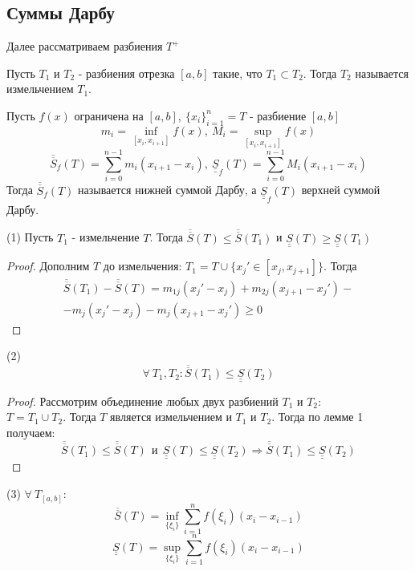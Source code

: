 \subsection{Суммы Дарбу}
Далее рассматриваем разбиения $T^+$
\begin{definition}
    Пусть $T_{1}$ и $T_{2}$ - разбиения отрезка $[a,b]$ такие, что $T_1\subset T_2$. Тогда $T_2$ называется измельчением $T_1$.
\end{definition} 
\begin{definition}
    Пусть $f(x)$ ограничена на $[a,b],\ \{x_i\}_{i=1}^n=T$ - разбиение $[a,b]$
    \[m_i=\inf\limits_{[x_i, x_{i+1}]} f(x),\ M_i=\sup\limits_{[x_i, x_{i+1}]}f(x)\] 
    \[\overline{\overline{S}}_f(T)=\sum\limits_{i=0}^{n-1}m_i(x_{i+1}-x_i),\ \underline{\underline{S}}_f(T)=\sum\limits_{i=0}^{n-1}M_i(x_{i+1}-x_i)\]
    Тогда $\overline{\overline{S}}_f(T)$ называется нижней суммой Дарбу, а $\underline{\underline{S}}_f(T)$ верхней суммой Дарбу.
\end{definition} 
\begin{lemma} (1)
    Пусть $T_1$ - измельчение $T$. Тогда $\overline{\overline{S}}(T)\leq \overline{\overline{S}}(T_1)$ и $\underline{\underline{S}}(T)\geq \underline{\underline{S}}(T_1)$
\end{lemma} 
\begin{proof}
    Дополним $T$ до измельчения: $T_1=T\cup \{x_j'\in [x_j, x_{j+1}]\}$. Тогда 
    \begin{multline*}
        \overline{\overline{S}}(T_1)-\overline{\overline{S}}(T)=m_{1j}(x_j'-x_j)+m_{2j}(x_{j+1}-x_j')-\\
        -m_j(x_j'-x_j)-m_j(x_{j+1}-x_j')\geq 0
    \end{multline*}
\end{proof} 
\begin{lemma} (2) 
    \[\forall\ T_1, T_2: \overline{\overline{S}}(T_1)\leq \underline{\underline{S}}(T_2)\]
\end{lemma} 
\begin{proof}
    Рассмотрим объединение любых двух разбиений $T_1$ и $T_2$:\\ $T=T_1\cup T_2$. Тогда $T$ является измельчением и $T_1$ и $T_2$. Тогда по лемме 1 получаем:
    \[\overline{\overline{S}}(T_1)\leq \overline{\overline{S}}(T)\ \ \text{и}\ \ \underline{\underline{S}}(T)\leq \underline{\underline{S}}(T_2) \Rightarrow \overline{\overline{S}}(T_1)\leq \underline{\underline{S}}(T_2)\]
\end{proof} 
\begin{lemma} (3) $\forall\ T_{[a,b]}:$
    \[\overline{\overline{S}}(T)=\inf\limits_{\{\xi_i\}}\sum\limits_{i=1}^{n}f(\xi_i)(x_i-x_{i-1})\]
    \[\underline{\underline{S}}(T)=\sup\limits_{\{\xi_i\}}\sum\limits_{i=1}^{n}f(\xi_i)(x_i-x_{i-1})\]
\end{lemma} 
